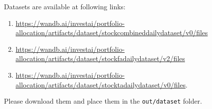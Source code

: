 \documentclass[../xlapes02]{subfiles}
\begin{document}
    Datasets are available at following links:
    \begin{enumerate}
        \item \url{https://wandb.ai/investai/portfolio-allocation/artifacts/dataset/stockcombineddailydataset/v0/files}
        \item \url{https://wandb.ai/investai/portfolio-allocation/artifacts/dataset/stockfadailydataset/v2/files}
        \item \url{https://wandb.ai/investai/portfolio-allocation/artifacts/dataset/stocktadailydataset/v0/files}.
    \end{enumerate}
    Please download them and place them in the \texttt{out/dataset} folder.

%
%
%
\end{document}

